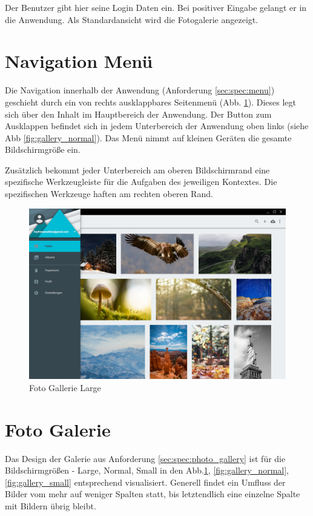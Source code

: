 Der Benutzer gibt hier seine Login Daten ein. Bei positiver Eingabe gelangt er in die Anwendung. Als Standardansicht wird die Fotogalerie angezeigt.

\section{Navigation Menü}
\label{sec:des:navigation_menu}

Die Navigation innerhalb der Anwendung (Anforderung \ref{sec:spec:menu}) geschieht durch ein von rechts ausklappbares Seitenmenü (Abb. \ref{fig:gallery_large}). Dieses legt sich über den Inhalt im Hauptbereich der Anwendung. Der Button zum Ausklappen befindet sich in jedem Unterbereich der Anwendung oben links (siehe Abb \ref{fig:gallery_normal}). Das Menü nimmt auf kleinen Geräten die gesamte Bildschirmgröße ein.

Zusätzlich bekommt jeder Unterbereich am oberen Bildschirmrand eine spezifische Werkzeugleiste für die Aufgaben des jeweiligen Kontextes. Die spezifischen Werkzeuge haften am rechten oberen Rand.

\begin{figure}[htp]     %
\centering
\includegraphics[width=1.0\textwidth]{images/gallery_large}
\caption{Foto Gallerie Large}\label{fig:gallery_large}
\end{figure}

\section{Foto Galerie}
\label{sec:ux:photo_gallery}

Das Design der Galerie aus Anforderung \ref{sec:spec:photo_gallery} ist für die Bildschirmgrößen - Large, Normal, Small in den Abb.\ref{fig:gallery_large}, \ref{fig:gallery_normal}, \ref{fig:gallery_small} entsprechend visualisiert. Generell findet ein Umfluss der Bilder vom mehr auf weniger Spalten statt, bis letztendlich eine einzelne Spalte mit Bildern übrig bleibt.

